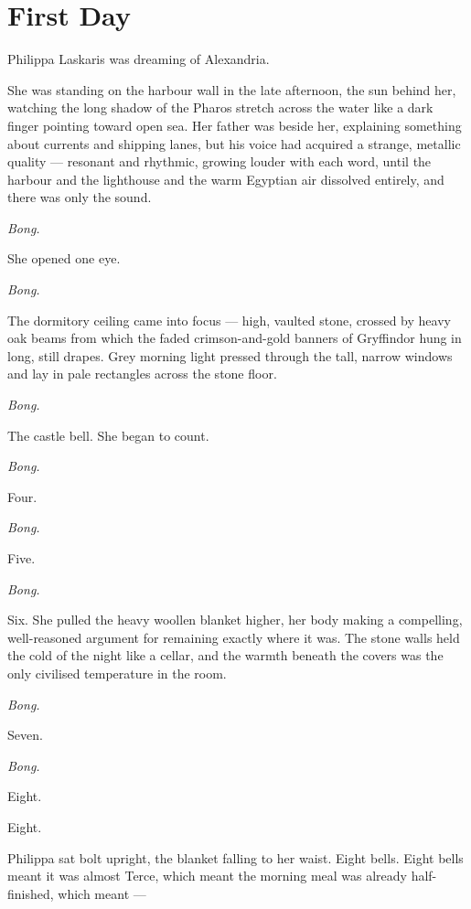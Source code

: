 
\chapter{First Day}

Philippa Laskaris was dreaming of Alexandria.

She was standing on the harbour wall in the late afternoon, the sun behind her, watching the long shadow of the Pharos stretch across the water like a dark finger pointing toward open sea. Her father was beside her, explaining something about currents and shipping lanes, but his voice had acquired a strange, metallic quality --- resonant and rhythmic, growing louder with each word, until the harbour and the lighthouse and the warm Egyptian air dissolved entirely, and there was only the sound.

\textit{Bong.}

She opened one eye.

\textit{Bong.}

The dormitory ceiling came into focus --- high, vaulted stone, crossed by heavy oak beams from which the faded crimson-and-gold banners of Gryffindor hung in long, still drapes. Grey morning light pressed through the tall, narrow windows and lay in pale rectangles across the stone floor.

\textit{Bong.}

The castle bell. She began to count.

\textit{Bong.}

Four.

\textit{Bong.}

Five.

\textit{Bong.}

Six. She pulled the heavy woollen blanket higher, her body making a compelling, well-reasoned argument for remaining exactly where it was. The stone walls held the cold of the night like a cellar, and the warmth beneath the covers was the only civilised temperature in the room.

\textit{Bong.}

Seven.

\textit{Bong.}

Eight.

Eight.

Philippa sat bolt upright, the blanket falling to her waist. Eight bells. Eight bells meant it was almost Terce, which meant the morning meal was already half-finished, which meant ---

